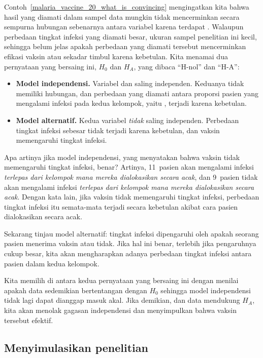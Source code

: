 Contoh~\ref{malaria_vaccine_20_what_is_convincing}
mengingatkan kita bahwa hasil yang diamati dalam sampel data
mungkin tidak mencerminkan secara sempurna hubungan sebenarnya
antara variabel karena terdapat .
Walaupun perbedaan tingkat infeksi yang diamati besar,
ukuran sampel penelitian ini kecil,
sehingga belum jelas apakah perbedaan yang diamati tersebut
mencerminkan efikasi vaksin atau sekadar timbul karena kebetulan.
Kita menamai dua pernyataan yang bersaing ini, $H_0$ dan $H_A$,
yang dibaca ``H-nol'' dan ``H-A'':
\begin{itemize}
\setlength{\itemsep}{0mm}
\item[$H_0$:] \textbf{Model independensi.}
    Variabel  dan 
    saling independen.
    Keduanya tidak memiliki hubungan, dan perbedaan yang diamati
    antara proporsi pasien yang mengalami infeksi
    pada kedua kelompok, yaitu \malariaIRDiffPerc{},
    terjadi karena kebetulan.
\item[$H_A$:] \textbf{Model alternatif.}
    Kedua variabel \emph{tidak} saling independen.
    Perbedaan tingkat infeksi sebesar
    \malariaIRDiffPerc{}
    tidak terjadi karena kebetulan,
    dan vaksin memengaruhi tingkat infeksi.
\end{itemize}

Apa artinya jika model independensi,
yang menyatakan bahwa vaksin tidak memengaruhi
tingkat infeksi, benar?
Artinya, 11~pasien akan mengalami infeksi
\emph{terlepas dari kelompok mana mereka dialokasikan
secara acak},
dan 9~pasien tidak akan mengalami infeksi
\emph{terlepas dari kelompok mana mereka dialokasikan
secara acak}.
Dengan kata lain, jika vaksin tidak memengaruhi tingkat
infeksi, perbedaan tingkat infeksi itu semata-mata
terjadi secara kebetulan akibat cara pasien dialokasikan
secara acak.

Sekarang tinjau model alternatif:
tingkat infeksi dipengaruhi oleh apakah seorang pasien
menerima vaksin atau tidak.
Jika hal ini benar, terlebih jika pengaruhnya cukup besar,
kita akan mengharapkan adanya perbedaan tingkat infeksi
antara pasien dalam kedua kelompok.

Kita memilih di antara kedua pernyataan yang bersaing ini
dengan menilai apakah data sedemikian bertentangan dengan
$H_0$ sehingga model independensi tidak lagi dapat dianggap
masuk akal.
Jika demikian, dan data mendukung $H_A$,
kita akan menolak gagasan independensi
dan menyimpulkan bahwa vaksin tersebut efektif.


\subsection{Menyimulasikan penelitian}
\label{simulatingTheStudy}

